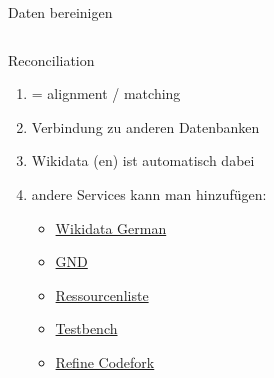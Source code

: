 \begin{frame}{Daten bereinigen}
\begin{columns}
\end{columns}


\begin{exampleblock}{Reconciliation}
  \begin{enumerate}\small 
      \item = alignment / matching
      \item Verbindung zu anderen Datenbanken
      \item Wikidata (en) ist automatisch dabei
      \item andere Services kann man hinzufügen:
      \begin{itemize}
          \item \href{https://tools.wmflabs.org/openrefine-wikidata/de/api}{Wikidata German}
          \item \href{https://lobid.org/gnd/reconcile}{GND}
          \item \href{https://github.com/OpenRefine/OpenRefine/wiki/Reconcilable-Data-Sources}{Ressourcenliste}
          \item \href{https://reconciliation-api.github.io/testbench/}{Testbench}
          \item \href{http://refine.codefork.com/}{Refine Codefork}
      \end{itemize}
  \end{enumerate}
\end{exampleblock}

\end{frame}



